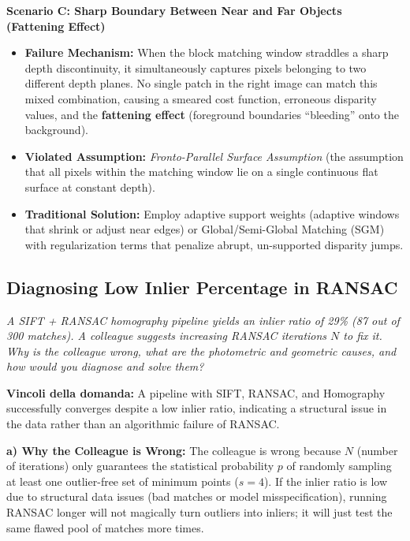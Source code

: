 \textbf{Scenario C: Sharp Boundary Between Near and Far Objects (Fattening Effect)}
\begin{itemize}
    \item \textbf{Failure Mechanism:} When the block matching window straddles a sharp depth discontinuity, it simultaneously captures pixels belonging to two different depth planes. No single patch in the right image can match this mixed combination, causing a smeared cost function, erroneous disparity values, and the \textbf{fattening effect} (foreground boundaries ``bleeding'' onto the background).
    \item \textbf{Violated Assumption:} \textit{Fronto-Parallel Surface Assumption} (the assumption that all pixels within the matching window lie on a single continuous flat surface at constant depth).
    \item \textbf{Traditional Solution:} Employ adaptive support weights (adaptive windows that shrink or adjust near edges) or Global/Semi-Global Matching (SGM) with regularization terms that penalize abrupt, un-supported disparity jumps.
\end{itemize}

\subsection[Question -- {\it RANSAC Inliers and Low Percentage Diagnosis}]{}

\subsection{Diagnosing Low Inlier Percentage in RANSAC}
\textit{A SIFT + RANSAC homography pipeline yields an inlier ratio of 29\% (87 out of 300 matches). A colleague suggests increasing RANSAC iterations $N$ to fix it. Why is the colleague wrong, what are the photometric and geometric causes, and how would you diagnose and solve them?}

\textbf{Vincoli della domanda:}
A pipeline with SIFT, RANSAC, and Homography successfully converges despite a low inlier ratio, indicating a structural issue in the data rather than an algorithmic failure of RANSAC.

\textbf{a) Why the Colleague is Wrong:}
The colleague is wrong because $N$ (number of iterations) only guarantees the statistical probability $p$ of randomly sampling at least one outlier-free set of minimum points ($s=4$). If the inlier ratio is low due to structural data issues (bad matches or model misspecification), running RANSAC longer will not magically turn outliers into inliers; it will just test the same flawed pool of matches more times.

